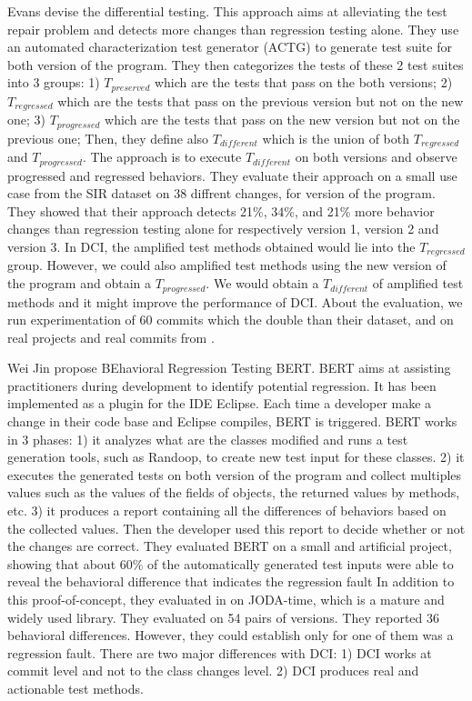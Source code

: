 Evans \etal \cite{evans2007differential} devise the differential testing.
This approach aims at alleviating the test repair problem and detects more changes than regression testing alone.
They use an automated characterization test generator (ACTG) to generate test suite for both version of the program.
They then categorizes the tests of these 2 test suites into 3 groups:
1) $T_{preserved}$ which are the tests that pass on the both versions;
2) $T_{regressed}$ which are the tests that pass on the previous version but not on the new one;
3) $T_{progressed}$ which are the tests that pass on the new version but not on the previous one;
Then, they define also $T_{different}$ which is the union of both $T_{regressed}$ and $T_{progressed}$.
The approach is to execute $T_{different}$ on both versions and observe progressed and regressed behaviors.
They evaluate their approach on a small use case from the SIR dataset on 38 diffrent changes, for version of the program.
They showed that their approach detects 21\%, 34\%, and 21\% more behavior changes than regression testing alone for respectively version 1, version 2 and version 3.
In DCI, the amplified test methods obtained would lie into the $T_{regressed}$ group.
However, we could also amplified test methods using the new version of the program and obtain a $T_{progressed}$.
We would obtain a $T_{different}$ of amplified test methods and it might improve the performance of DCI.
About the evaluation, we run experimentation of 60 commits which the double than their dataset, and on real 
projects and real commits from \gh.

Wei Jin \etal \cite{automated-behavioral-regression-testing} propose BEhavioral Regression
Testing BERT.
BERT aims at assisting practitioners during development to identify potential regression.
It has been implemented as a plugin for the IDE Eclipse.
Each time a developer make a change in their code base and Eclipse compiles, BERT is triggered.
BERT works in 3 phases:
1) it analyzes what are the classes modified and runs a test generation tools, such as Randoop, to create new test input for these classes.
2) it executes the generated tests on both version of the program and collect multiples values such as the values of the fields of objects, the returned values by methods, etc.
3) it produces a report containing all the differences of behaviors based on the collected values.
Then the developer used this report to decide whether or not the changes are correct.
They evaluated BERT on a small and artificial project, showing that about 60\% of the automatically generated test inputs were able to reveal the behavioral difference that indicates the regression fault
In addition to this proof-of-concept, they evaluated in on JODA-time, which is a mature and widely used library.
They evaluated on 54 pairs of versions.
They reported 36 behavioral differences.
However, they could establish only for one of them was a regression fault.
There are two major differences with DCI:
1) DCI works at commit level and not to the class changes level.
2) DCI produces real and actionable test methods.

